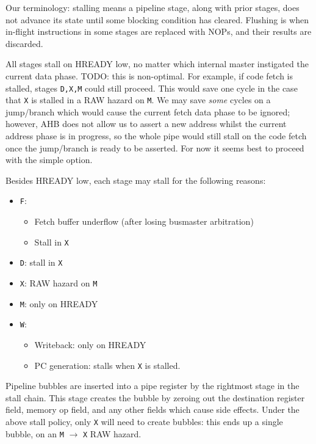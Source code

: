 \documentclass{article}
\begin{document}
Our terminology: stalling means a pipeline stage, along with prior stages, does not advance its state until some blocking condition has cleared. Flushing is when in-flight instructions in some stages are replaced with NOPs, and their results are discarded.

All stages stall on HREADY low, no matter which internal master instigated the current data phase. TODO: this is non-optimal. For example, if code fetch is stalled, stages \texttt{D,X,M} could still proceed. This would save one cycle in the case that \texttt{X} is stalled in a RAW hazard on \texttt{M}. We may save \textit{some} cycles on a jump/branch which would cause the current fetch data phase to be ignored; however, AHB does not allow us to assert a new address whilst the current address phase is in progress, so the whole pipe would still stall on the code fetch once the jump/branch is ready to be asserted. For now it seems best to proceed with the simple option.

Besides HREADY low, each stage may stall for the following reasons:

\begin{itemize}
	\item \texttt{F}: 
	\begin{itemize}
		\item Fetch buffer underflow (after losing busmaster arbitration)
		\item  Stall in \texttt{X}
	\end{itemize}
	\item \texttt{D}: stall in \texttt{X}
	\item \texttt{X}: RAW hazard on \texttt{M}
	\item \texttt{M}: only on HREADY
	\item \texttt{W}:
	\begin{itemize}
		\item Writeback: only on HREADY
		\item PC generation: stalls when \texttt{X} is stalled.
	\end{itemize}
\end{itemize}

Pipeline bubbles are inserted into a pipe register by the rightmost stage in the stall chain. This stage creates the bubble by zeroing out the destination register field, memory op field, and any other fields which cause side effects. Under the above stall policy, only \texttt{X} will need to create bubbles: this ends up a single bubble, on an \texttt{M} $\to$ \texttt{X} RAW hazard.
\end{document}
